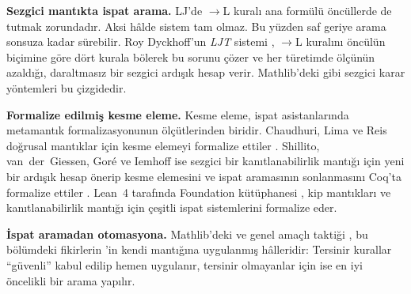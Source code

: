 \begin{arastirmanotu}
\textbf{Sezgici mantıkta ispat arama.} LJ'de $\to$L kuralı ana formülü
öncüllerde de tutmak zorundadır. Aksi hâlde sistem tam olmaz. Bu yüzden
saf geriye arama sonsuza kadar sürebilir. Roy Dyckhoff'un \emph{LJT}
sistemi \citep{dyckhoff1992}, $\to$L kuralını öncülün biçimine göre dört
kurala bölerek bu sorunu çözer ve her türetimde ölçünün azaldığı,
daraltmasız bir sezgici ardışık hesap verir. Mathlib'deki 
gibi sezgici karar yöntemleri bu çizgidedir.

\textbf{Formalize edilmiş kesme eleme.} Kesme eleme, ispat asistanlarında
metamantık formalizasyonunun ölçütlerinden biridir. Chaudhuri, Lima ve
Reis doğrusal mantıklar için kesme elemeyi formalize ettiler
\citep{chaudhuri2019}. Shillito, van~der~Giessen, Goré ve Iemhoff ise
sezgici bir kanıtlanabilirlik mantığı için yeni bir ardışık hesap
önerip kesme elemesini ve ispat aramasının sonlanmasını Coq'ta
formalize ettiler \citep{shillito2023}. Lean~4 tarafında Foundation
kütüphanesi \citep{foundation}, kip mantıkları ve kanıtlanabilirlik
mantığı için çeşitli ispat sistemlerini formalize eder.

\textbf{İspat aramadan otomasyona.} Mathlib'deki  ve
genel amaçlı  taktiği \citep{limperg2023aesop}, bu
bölümdeki fikirlerin \Lean{}'in kendi mantığına uygulanmış hâlleridir:
Tersinir kurallar ``güvenli'' kabul edilip hemen uygulanır, tersinir
olmayanlar için ise en iyi öncelikli bir arama yapılır.
\end{arastirmanotu}

